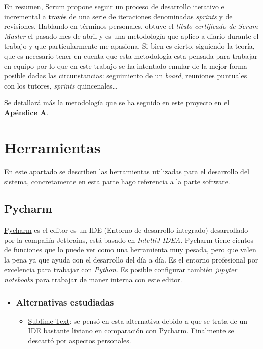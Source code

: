 En resumen, Scrum propone seguir un proceso de desarrollo iterativo e incremental a través de una serie de iteraciones denominadas \textit{sprints} y de revisiones. 
Hablando en términos personales, obtuve el \textit{título certificado de Scrum Master} el pasado mes de abril y es una metodología que aplico a diario durante el trabajo y que particularmente me apasiona. Si bien es cierto, siguiendo la teoría, que es necesario tener en cuenta que esta metodología esta pensada para trabajar en equipo por lo que en este trabajo se ha intentado emular de la mejor forma posible dadas las circunstancias: seguimiento de un \emph{board}, reuniones puntuales con los tutores, \emph{sprints} quincenales\ldots


Se detallará más la metodología que se ha seguido en este proyecto en el \textbf{Apéndice A}.
\section{Herramientas}\label{herramientas}
En este apartado se describen las herramientas utilizadas para el desarrollo del sistema, concretamente en esta parte hago referencia a la parte software.

\subsection{Pycharm}\label{herramientas_pycharm}
\href{https://www.jetbrains.com/pycharm/}{Pycharm} es el editor es un IDE (Entorno de desarrollo integrado) desarrollado por la compañía Jetbrains, está basado en\textit{ IntelliJ IDEA}. Pycharm tiene cientos de funciones que lo puede ver como una herramienta muy pesada, pero que valen la pena ya que ayuda con el desarrollo del día a día. Es el entorno profesional por excelencia para trabajar con \textit{Python}. Es posible configurar también\textit{ jupyter notebooks} para trabajar de maner interna con este editor.

\begin{itemize}
	\item \subsubsection{Alternativas estudiadas}
	\begin{itemize}
		\item \href{www.sublimetext.com}{Sublime Text}: se pensó en esta alternativa debido a que se trata de un IDE bastante liviano en comparación con Pycharm. Finalmente se descartó por aspectos personales.
	\end{itemize}
\end{itemize}


